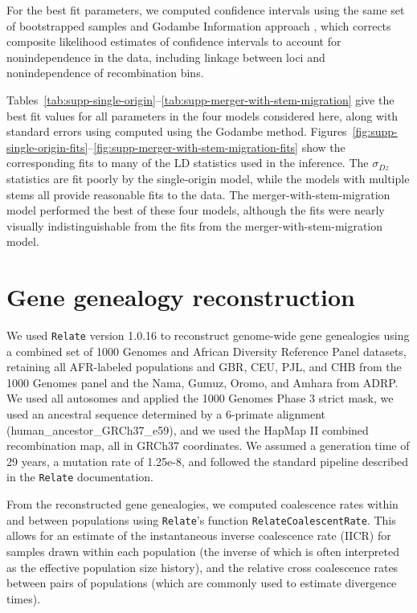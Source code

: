 \documentclass[]{article}
\newcommand{\Relate}{\texttt{Relate}\xspace}
\begin{document}
For the best fit parameters, we computed confidence intervals using the 
same set of bootstrapped samples and Godambe Information
approach \citep{Coffman2016-yq}, which corrects composite likelihood estimates of confidence intervals
to account for nonindependence in the data, including linkage between loci and
nonindependence of recombination bins.

Tables~\ref{tab:supp-single-origin}--\ref{tab:supp-merger-with-stem-migration}
give the best fit values for all parameters in the four models considered here,
along with standard errors using computed using the Godambe method.
Figures~\ref{fig:supp-single-origin-fits}--\ref{fig:supp-merger-with-stem-migration-fits}
show the corresponding fits to many of the LD statistics used in the inference.
The $\sigma_{Dz}$ statistics are fit poorly by the single-origin model, while
the models with multiple stems all provide reasonable fits to the data. The
merger-with-stem-migration model performed the best of these four models,
although the fits were nearly visually indistinguishable from the fits from the
merger-with-stem-migration model.

\section{Gene genealogy reconstruction}
\label{sec:relate}

We used \Relate version 1.0.16 \citep{Speidel2019-nj} to reconstruct genome-wide
gene genealogies using a combined set of 1000 Genomes and African Diversity
Reference Panel datasets, retaining all AFR-labeled populations and GBR, CEU,
PJL, and CHB from the 1000 Genomes panel and the Nama, Gumuz, Oromo, and Amhara
from ADRP. We used all autosomes and applied the 1000 Genomes Phase 3 strict
mask, we used an ancestral sequence determined by a 6-primate alignment
(human\_ancestor\_GRCh37\_e59), and we used the HapMap II combined
recombination map, all in GRCh37 coordinates. We assumed a generation time of
29 years, a mutation rate of 1.25e-8, and followed the standard pipeline
described in the \Relate documentation.

From the reconstructed gene genealogies, we computed coalescence rates within
and between populations using \texttt{Relate}’s function \texttt{RelateCoalescentRate}.
This allows for an estimate of the instantaneous inverse coalescence rate
(IICR) for samples drawn within each population (the inverse of which is often
interpreted as the effective population size history), and the relative cross
coalescence rates between pairs of populations (which are commonly used to
estimate divergence times).
\end{document}
